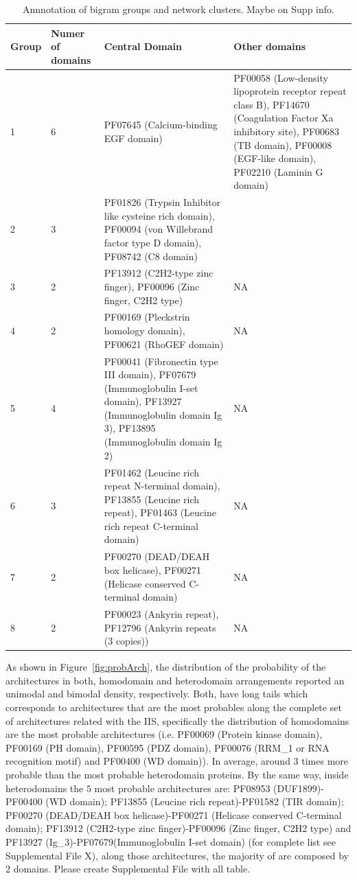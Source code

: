 \documentclass[11pt]{article}
\newcommand{\TODO}[1]{\begingroup\color{red}#1\endgroup}
\begin{document}
\begin{table}
\centering
\begin{tabular}{p{1cm}p{1.5cm}p{7cm}p{5cm}}
  \toprule 
  \textbf{Group} & \textbf{Numer of domains} & \textbf{Central Domain} & \textbf{Other domains} \\
  \midrule 
  1 & 6 & PF07645 (Calcium-binding EGF domain)& PF00058 (Low-density lipoprotein receptor repeat class B),
  PF14670 (Coagulation Factor Xa inhibitory site), PF00683 (TB domain), PF00008 (EGF-like domain), 
  PF02210 (Laminin G domain) \\
  2 & 3 & PF01826 (Trypsin Inhibitor like cysteine rich domain), PF00094 (von Willebrand factor type D domain), 
  PF08742 (C8 domain) \\
  3 & 2 & PF13912 (C2H2-type zinc finger), PF00096 (Zinc finger, C2H2 type) & NA \\
  4 & 2 & PF00169 (Pleckstrin homology domain), PF00621 (RhoGEF domain) & NA \\
  5 & 4 & PF00041 (Fibronectin type III domain), PF07679 (Immunoglobulin I-set domain), 
  PF13927 (Immunoglobulin domain Ig 3), PF13895 (Immunoglobulin domain Ig 2) & NA \\
  6 & 3 & PF01462 (Leucine rich repeat N-terminal domain), PF13855 (Leucine rich repeat),
  PF01463 (Leucine rich repeat C-terminal domain) & NA \\
  7 & 2 & PF00270 (DEAD/DEAH box helicase), PF00271 (Helicase conserved C-terminal domain) & NA \\
  8 & 2 & PF00023 (Ankyrin repeat), PF12796 (Ankyrin repeats (3 copies)) & NA \\
  \bottomrule 
\end{tabular}
\caption{Annnotation of bigram groups and network clusters. \TODO{Maybe on Supp info.}}\label{tab:meansDomains}
\end{table}

As shown in Figure~\ref{fig:probArch}, the distribution of the probability of the 
architectures in both, homodomain and heterodomain arrangements reported an unimodal 
and bimodal density, respectively. Both, have long tails which corresponds to architectures that
are the most probables along the complete set of architectures related with the IIS, 
specifically the distribution of homodomains are the most probable architectures 
(i.e. PF00069 (Protein kinase domain), PF00169 (PH domain), PF00595 (PDZ domain), 
PF00076 (RRM\_1 or RNA recognition motif) and PF00400 (WD domain)). In average, around $3$ times
more probable than the most probable heterodomain proteins. By the same way, inside 
heterodomains the $5$ most probable architectures are: PF08953 (DUF1899)-PF00400 (WD domain); 
PF13855 (Leucine rich repeat)-PF01582 (TIR domain); PF00270 (DEAD/DEAH box helicase)-PF00271 
(Helicase conserved C-terminal domain); PF13912 (C2H2-type zinc finger)-PF00096
(Zinc finger, C2H2 type) and PF13927 (Ig\_3)-PF07679(Immunoglobulin I-set domain)
(for complete list see Supplemental File X), along those architectures, the majority of 
are composed by $2$ domains. \TODO{Please create Supplemental File with all table}.
\end{document}
